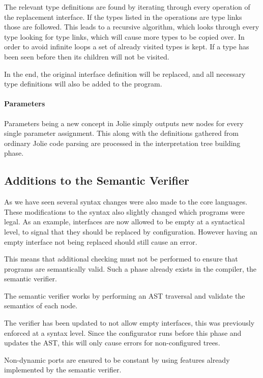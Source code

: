The relevant type definitions are found by iterating through every operation of
the replacement interface. If the types listed in the operations are type links
those are followed. This leads to a recursive algorithm, which looks through
every type looking for type links, which will cause more types to be copied
over. In order to avoid infinite loops a set of already visited types is kept.
If a type has been seen before then its children will not be visited.

In the end, the original interface definition will be replaced, and all
necessary type definitions will also be added to the program.

\paragraph{Parameters}

Parameters being a new concept in Jolie simply outputs new nodes for every
single parameter assignment. This along with the definitions gathered from
ordinary Jolie code parsing are processed in the interpretation tree building
phase.

\subsection{Additions to the Semantic Verifier}

As we have seen several syntax changes were also made to the core languages.
These modifications to the syntax also slightly changed which programs were
legal. As an example, interfaces are now allowed to be empty at a syntactical
level, to signal that they should be replaced by configuration. However having
an empty interface not being replaced should still cause an error.

This means that additional checking must not be performed to ensure that
programs are semantically valid. Such a phase already exists in the compiler,
the semantic verifier.

The semantic verifier works by performing an AST traversal and validate the
semantics of each node.

The verifier has been updated to not allow empty interfaces, this was
previously enforced at a syntax level. Since the configurator runs before this
phase and updates the AST, this will only cause errors for non-configured
trees.

Non-dynamic ports are ensured to be constant by using features already
implemented by the semantic verifier.


